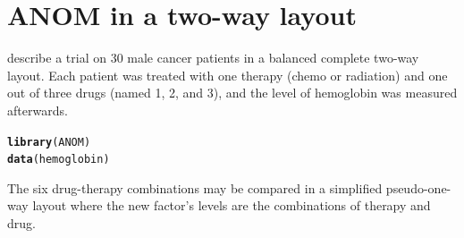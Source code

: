\documentclass[a4paper]{article}\usepackage[]{graphicx}\usepackage[]{color}
\makeatletter
\newcommand{\hlstd}[1]{\textcolor[rgb]{0.345,0.345,0.345}{#1}}%
\newcommand{\hlkwd}[1]{\textcolor[rgb]{0.737,0.353,0.396}{\textbf{#1}}}%
\newenvironment{kframe}{%
 \def\at@end@of@kframe{}%
 \ifinner\ifhmode%
  \def\at@end@of@kframe{\end{minipage}}%
  \begin{minipage}{\columnwidth}%
 \fi\fi%
 \def\FrameCommand##1{\hskip\@totalleftmargin \hskip-\fboxsep
 \colorbox{shadecolor}{##1}\hskip-\fboxsep
     \hskip-\linewidth \hskip-\@totalleftmargin \hskip\columnwidth}%
 \MakeFramed {\advance\hsize-\width
   \@totalleftmargin\z@ \linewidth\hsize
   \@setminipage}}%
 {\par\unskip\endMakeFramed%
 \at@end@of@kframe}
\newenvironment{knitrout}{}{} %
\makeatother
\begin{document}
\section{ANOM in a two-way layout}
\label{Twoway}

\citet{Nelson2005} describe a trial on 30 male cancer patients in a balanced complete two-way layout. Each patient was treated with one therapy (chemo or radiation) and one out of three drugs (named 1, 2, and 3), and the level of hemoglobin was measured afterwards.

\begin{knitrout}
\color{fgcolor}\begin{kframe}
\begin{alltt}
\hlkwd{library}\hlstd{(ANOM)}
\hlkwd{data}\hlstd{(hemoglobin)}
\end{alltt}
\end{kframe}
\end{knitrout}

The six drug-therapy combinations may be compared in a simplified pseudo-one-way layout where the new factor's levels are the combinations of therapy and drug.
\end{document}
